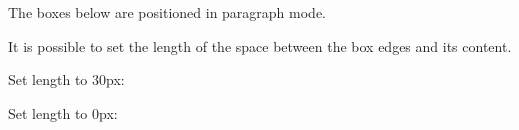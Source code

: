 \documentclass{basic}
\begin{document}

     The boxes below are positioned in paragraph mode.

       
       
       
       
       
       
       
       
       
       
       
       
       
       






     It is possible to set the length of the space between the box edges and its content.

     Set length to 30px:

     \setlength{\fboxsep}{30px}
    
     Set length to 0px:

     \setlength{\fboxsep}{0px}
       
       
       
       
       
       
       
       
       
       
       
       
       
       
\end{document}
